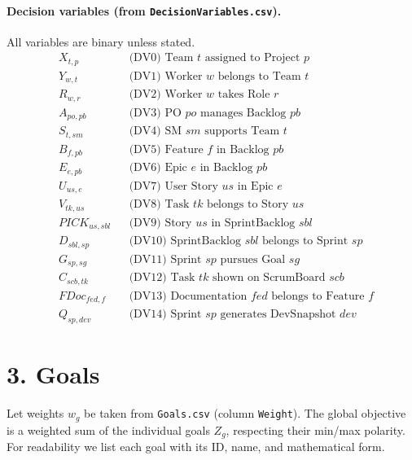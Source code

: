 \documentclass[11pt,a4paper]{article}
\begin{document}
\paragraph{Decision variables (from \texttt{DecisionVariables.csv}).}
All variables are binary unless stated.
\[
\begin{aligned}
&X_{t,p} &&\text{(DV0) Team $t$ assigned to Project $p$} \\
&Y_{w,t} &&\text{(DV1) Worker $w$ belongs to Team $t$} \\
&R_{w,r} &&\text{(DV2) Worker $w$ takes Role $r$} \\
&A_{po,pb} &&\text{(DV3) PO $po$ manages Backlog $pb$} \\
&S_{t,sm} &&\text{(DV4) SM $sm$ supports Team $t$} \\
&B_{f,pb} &&\text{(DV5) Feature $f$ in Backlog $pb$} \\
&E_{e,pb} &&\text{(DV6) Epic $e$ in Backlog $pb$} \\
&U_{us,e} &&\text{(DV7) User Story $us$ in Epic $e$} \\
&V_{tk,us} &&\text{(DV8) Task $tk$ belongs to Story $us$} \\
&PICK_{us,sbl} &&\text{(DV9) Story $us$ in SprintBacklog $sbl$} \\
&D_{sbl,sp} &&\text{(DV10) SprintBacklog $sbl$ belongs to Sprint $sp$} \\
&G_{sp,sg} &&\text{(DV11) Sprint $sp$ pursues Goal $sg$} \\
&C_{scb,tk} &&\text{(DV12) Task $tk$ shown on ScrumBoard $scb$} \\
&FDoc_{fed,f} &&\text{(DV13) Documentation $fed$ belongs to Feature $f$} \\
&Q_{sp,dev} &&\text{(DV14) Sprint $sp$ generates DevSnapshot $dev$}
\end{aligned}
\]

\section{3. Goals}
Let weights $w_g$ be taken from \texttt{Goals.csv} (column \texttt{Weight}). The global objective is a weighted sum of the individual goals $Z_g$, respecting their min/max polarity. For readability we list each goal with its ID, name, and mathematical form.
\end{document}
